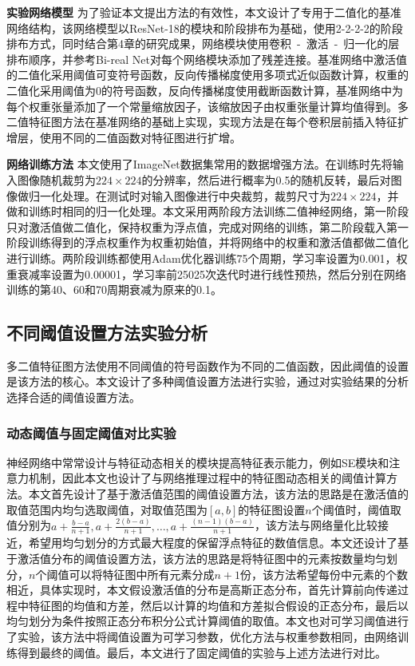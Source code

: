 \textbf{实验网络模型} \quad 为了验证本文提出方法的有效性，本文设计了专用于二值化的基准网络结构，该网络模型以ResNet-18\cite{resnet}的模块和阶段排布为基础，使用2-2-2-2的阶段排布方式，同时结合第4章的研究成果，网络模块使用卷积\ -\ 激活\ -\ 归一化的层排布顺序，并参考Bi-real Net\cite{birealnet}对每个网络模块添加了残差连接。基准网络中激活值的二值化采用阈值可变符号函数，反向传播梯度使用多项式近似函数计算，权重的二值化采用阈值为0的符号函数，反向传播梯度使用截断函数计算，基准网络中为每个权重张量添加了一个常量缩放因子，该缩放因子由权重张量计算均值得到。多二值特征图方法在基准网络的基础上实现，实现方法是在每个卷积层前插入特征扩增层，使用不同的二值函数对特征图进行扩增。

\textbf{网络训练方法} \quad 本文使用了ImageNet数据集常用的数据增强方法。在训练时先将输入图像随机裁剪为$224 \times 224$的分辨率，然后进行概率为0.5的随机反转，最后对图像做归一化处理。在测试时对输入图像进行中央裁剪，裁剪尺寸为$224 \times 224$，并做和训练时相同的归一化处理。本文采用两阶段方法训练二值神经网络，第一阶段只对激活值做二值化，保持权重为浮点值，完成对网络的训练，第二阶段载入第一阶段训练得到的浮点权重作为权重初始值，并将网络中的权重和激活值都做二值化进行训练。两阶段训练都使用Adam优化器训练75个周期，学习率设置为0.001，权重衰减率设置为0.00001，学习率前25025次迭代时进行线性预热，然后分别在网络训练的第40、60和70周期衰减为原来的0.1。

\subsection{不同阈值设置方法实验分析}

多二值特征图方法使用不同阈值的符号函数作为不同的二值函数，因此阈值的设置是该方法的核心。本文设计了多种阈值设置方法进行实验，通过对实验结果的分析选择合适的阈值设置方法。

\subsubsection{动态阈值与固定阈值对比实验}

神经网络中常常设计与特征动态相关的模块提高特征表示能力，例如SE模块\cite{se}和注意力机制，因此本文也设计了与网络推理过程中的特征图动态相关的阈值计算方法。本文首先设计了基于激活值范围的阈值设置方法，该方法的思路是在激活值的取值范围内均匀选取阈值，对取值范围为$[a, b]$的特征图设置$n$个阈值时，阈值取值分别为$a + \frac{b - a}{n + 1}, a + \frac{2(b - a)}{n + 1}, \dots, a + \frac{(n-1)(b - a)}{n + 1}$，该方法与网络量化比较接近，希望用均匀划分的方式最大程度的保留浮点特征的数值信息。本文还设计了基于激活值分布的阈值设置方法，该方法的思路是将特征图中的元素按数量均匀划分，$n$个阈值可以将特征图中所有元素分成$n+1$份，该方法希望每份中元素的个数相近，具体实现时，本文假设激活值的分布是高斯正态分布，首先计算前向传递过程中特征图的均值和方差，然后以计算的均值和方差拟合假设的正态分布，最后以均匀划分为条件按照正态分布积分公式计算阈值的取值。本文也对可学习阈值进行了实验，该方法中将阈值设置为可学习参数，优化方法与权重参数相同，由网络训练得到最终的阈值。最后，本文进行了固定阈值的实验与上述方法进行对比。

